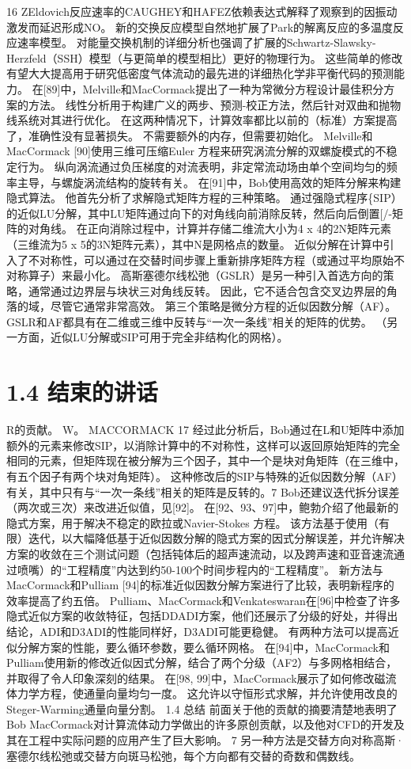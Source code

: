 \documentclass[UTF8,11pt,a4paper,openany,fontset=fandol]{ctexbook}
\begin{document}
16 ZEldovich反应速率的CAUGHEY和HAFEZ依赖表达式解释了观察到的因振动激发而延迟形成NO。 新的交换反应模型自然地扩展了Park的解离反应的多温度反应速率模型。 对能量交换机制的详细分析也强调了扩展的Schwartz-Slawsky-Herzfeld（SSH）模型（与更简单的模型相比）更好的物理行为。 这些简单的修改有望大大提高用于研究低密度气体流动的最先进的详细热化学非平衡代码的预测能力。 在[89]中，Melville和MacCormack提出了一种为常微分方程设计最佳积分方案的方法。 线性分析用于构建广义的两步、预测-校正方法，然后针对双曲和抛物线系统对其进行优化。 在这两种情况下，计算效率都比以前的（标准）方案提高了，准确性没有显著损失。 不需要额外的内存，但需要初始化。 Melville和MacCormack [90]使用三维可压缩Euler 方程来研究涡流分解的双螺旋模式的不稳定行为。 纵向涡流通过负压梯度的对流表明，非定常流动场由单个空间均匀的频率主导，与螺旋涡流结构的旋转有关。 在[91]中，Bob使用高效的矩阵分解来构建隐式算法。 他首先分析了求解隐式矩阵方程的三种策略。 通过强隐式程序\{SIP）的近似LU分解，其中LU矩阵通过向下的对角线向前消除反转，然后向后倒置[/-矩阵的对角线。 在正向消除过程中，计算并存储二维流大小为4 x 4的2N矩阵元素（三维流为5 x 5的3N矩阵元素），其中N是网格点的数量。 近似分解在计算中引入了不对称性，可以通过在交替时间步骤上重新排序矩阵方程（或通过平均原始不对称算子）来最小化。 高斯塞德尔线松弛（GSLR）是另一种引入首选方向的策略，通常通过边界层与块状三对角线反转。 因此，它不适合包含交叉边界层的角落的域，尽管它通常非常高效。 第三个策略是微分方程的近似因数分解（AF）。 GSLR和AF都具有在二维或三维中反转与“一次一条线”相关的矩阵的优势。 （另一方面，近似LU分解或SIP可用于完全非结构化的网格）。

\section{1.4 结束的讲话}
R的贡献。 W。 MACCORMACK 17 经过此分析后，Bob通过在L和U矩阵中添加额外的元素来修改SIP，以消除计算中的不对称性，这样可以返回原始矩阵的完全相同的元素，但矩阵现在被分解为三个因子，其中一个是块对角矩阵（在三维中，有五个因子有两个块对角矩阵）。 这种修改后的SIP与特殊的近似因数分解（AF）有关，其中只有与“一次一条线”相关的矩阵是反转的。7 Bob还建议迭代拆分误差（两次或三次）来改进近似值，见[92]。 在[92、93、97]中，鲍勃介绍了他最新的隐式方案，用于解决不稳定的欧拉或Navier-Stokes 方程。 该方法基于使用（有限）迭代，以大幅降低基于近似因数分解的隐式方案的因式分解误差，并允许解决方案的收敛在三个测试问题（包括钝体后的超声速流动，以及跨声速和亚音速流通过喷嘴）的“工程精度”内达到约50-100个时间步程内的“工程精度”。 新方法与MacCormack和Pulliam [94]的标准近似因数分解方案进行了比较，表明新程序的效率提高了约五倍。 Pulliam、MacCormack和Venkateswaran在[96]中检查了许多隐式近似方案的收敛特征，包括DDADI方案，他们还展示了分级的好处，并得出结论，ADI和D3ADI的性能同样好，D3ADI可能更稳健。 有两种方法可以提高近似分解方案的性能，要么循环参数，要么循环网格。 在[94]中，MacCormack和Pulliam使用新的修改近似因式分解，结合了两个分级（AF2）与多网格相结合，并取得了令人印象深刻的结果。 在[98, 99]中，MacCormack展示了如何修改磁流体力学方程，使通量向量均匀一度。 这允许以守恒形式求解，并允许使用改良的Steger-Warming通量向量分割。 1.4 总结 前面关于他的贡献的摘要清楚地表明了Bob MacCormack对计算流体动力学做出的许多原创贡献，以及他对CFD的开发及其在工程中实际问题的应用产生了巨大影响。 7 另一种方法是交替方向对称高斯·塞德尔线松弛或交替方向斑马松弛，每个方向都有交替的奇数和偶数线。
\end{document}
